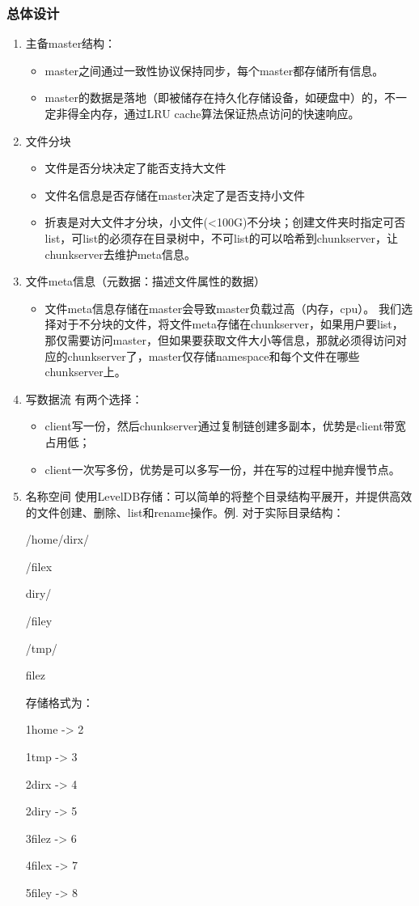 \documentclass{ctexart}
\begin{document}
\subsubsection{总体设计}
\begin{enumerate}
	\item 主备master结构：
	\begin{itemize}
		\item master之间通过一致性协议保持同步，每个master都存储所有信息。
		\item master的数据是落地（即被储存在持久化存储设备，如硬盘中）的，不一定非得全内存，通过LRU cache算法保证热点访问的快速响应。
	\end{itemize}
	\item 文件分块
	\begin{itemize}
		\item 文件是否分块决定了能否支持大文件
		\item 文件名信息是否存储在master决定了是否支持小文件
		\item 折衷是对大文件才分块，小文件(<100G)不分块；创建文件夹时指定可否list，可list的必须存在目录树中，不可list的可以哈希到chunkserver，让chunkserver去维护meta信息。
	\end{itemize}
	\item 文件meta信息（元数据：描述文件属性的数据）
	\begin{itemize}
		\item 文件meta信息存储在master会导致master负载过高（内存，cpu）。 我们选择对于不分块的文件，将文件meta存储在chunkserver，如果用户要list，那仅需要访问master，但如果要获取文件大小等信息，那就必须得访问对应的chunkserver了，master仅存储namespace和每个文件在哪些chunkserver上。
	\end{itemize}
	\item 写数据流
	有两个选择：
	\begin{itemize}
		\item client写一份，然后chunkserver通过复制链创建多副本，优势是client带宽占用低；
		\item client一次写多份，优势是可以多写一份，并在写的过程中抛弃慢节点。
	\end{itemize}
	\item 名称空间
	使用LevelDB存储：可以简单的将整个目录结构平展开，并提供高效的文件创建、删除、list和rename操作。例. 对于实际目录结构：

	/home/dirx/

	/filex

	diry/

	/filey

	/tmp/

	filez

	存储格式为：

	1home -> 2

	1tmp -> 3

	2dirx -> 4

	2diry -> 5

	3filez -> 6

	4filex -> 7

	5filey -> 8
\end{enumerate}
\end{document}
